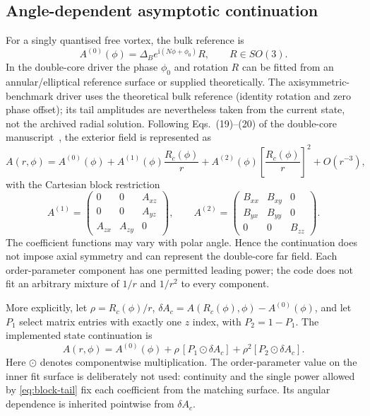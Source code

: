 \documentclass[11pt,a4paper]{article}
\newcommand{\ii}{\mathrm{i}}
\begin{document}
\subsection{Angle-dependent asymptotic continuation}

For a singly quantised free vortex, the bulk reference is
\begin{equation}
  A^{(0)}(\phi)=\Delta_B
  e^{\ii(N\phi+\phi_0)}R,
  \qquad R\in SO(3).
  \label{eq:bulk-tail}
\end{equation}
In the double-core driver the phase $\phi_0$ and rotation $R$ can be fitted from an annular/elliptical
reference surface or supplied theoretically. The axisymmetric-benchmark driver
uses the theoretical bulk reference (identity rotation and zero phase offset);
its tail amplitudes are nevertheless taken from the current state, not the
archived radial solution. Following Eqs.~(19)--(20) of
the double-core manuscript~\cite{dcvlong}, the exterior field is represented
as
\begin{equation}
  A(r,\phi)=A^{(0)}(\phi)
  +A^{(1)}(\phi)\frac{R_c(\phi)}{r}
  +A^{(2)}(\phi)\left[\frac{R_c(\phi)}{r}\right]^2
  +O(r^{-3}),
  \label{eq:Aasymptotic}
\end{equation}
with the Cartesian block restriction
\begin{equation}
 A^{(1)}=
 \begin{pmatrix}0&0&A_{xz}\\0&0&A_{yz}\\A_{zx}&A_{zy}&0\end{pmatrix},
 \qquad
 A^{(2)}=
 \begin{pmatrix}B_{xx}&B_{xy}&0\\B_{yx}&B_{yy}&0\\0&0&B_{zz}\end{pmatrix}.
 \label{eq:block-tail}
\end{equation}
The coefficient functions may vary with polar angle.  Hence the continuation
does not impose axial symmetry and can represent the double-core far field.
Each order-parameter component has one permitted leading power; the code does
not fit an arbitrary mixture of $1/r$ and $1/r^2$ to every component.

More explicitly, let $\rho=R_c(\phi)/r$,
$\delta A_c=A(R_c(\phi),\phi)-A^{(0)}(\phi)$, and let $P_1$ select matrix
entries with exactly one $z$ index, with $P_2=1-P_1$.  The implemented state
continuation is
\begin{equation}
  A(r,\phi)=A^{(0)}(\phi)
  +\rho\,[P_1\mathbin{\odot}\delta A_c]
  +\rho^2[P_2\mathbin{\odot}\delta A_c].
  \label{eq:implemented-A-tail}
\end{equation}
Here $\odot$ denotes componentwise multiplication.  The order-parameter value
on the inner fit surface is deliberately not used: continuity and the single
power allowed by \eqref{eq:block-tail} fix each coefficient from the matching
surface.  Its angular dependence is inherited pointwise from $\delta A_c$.
\end{document}

